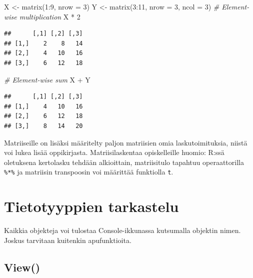 \documentclass[
]{book}
\newenvironment{Shaded}{\begin{snugshade}}{\end{snugshade}}
\newcommand{\AttributeTok}[1]{\textcolor[rgb]{0.77,0.63,0.00}{#1}}
\newcommand{\CommentTok}[1]{\textcolor[rgb]{0.56,0.35,0.01}{\textit{#1}}}
\newcommand{\DecValTok}[1]{\textcolor[rgb]{0.00,0.00,0.81}{#1}}
\newcommand{\FunctionTok}[1]{\textcolor[rgb]{0.00,0.00,0.00}{#1}}
\newcommand{\NormalTok}[1]{#1}
\newcommand{\OtherTok}[1]{\textcolor[rgb]{0.56,0.35,0.01}{#1}}
\newcommand{\SpecialCharTok}[1]{\textcolor[rgb]{0.00,0.00,0.00}{#1}}
\begin{document}
\begin{Shaded}
\begin{Highlighting}[]
\NormalTok{X }\OtherTok{\textless{}{-}} \FunctionTok{matrix}\NormalTok{(}\DecValTok{1}\SpecialCharTok{:}\DecValTok{9}\NormalTok{, }\AttributeTok{nrow =} \DecValTok{3}\NormalTok{)}
\NormalTok{Y }\OtherTok{\textless{}{-}} \FunctionTok{matrix}\NormalTok{(}\DecValTok{3}\SpecialCharTok{:}\DecValTok{11}\NormalTok{, }\AttributeTok{nrow =} \DecValTok{3}\NormalTok{, }\AttributeTok{ncol =} \DecValTok{3}\NormalTok{)}
\CommentTok{\# Element{-}wise multiplication}
\NormalTok{X }\SpecialCharTok{*} \DecValTok{2}
\end{Highlighting}
\end{Shaded}

\begin{verbatim}
##      [,1] [,2] [,3]
## [1,]    2    8   14
## [2,]    4   10   16
## [3,]    6   12   18
\end{verbatim}

\begin{Shaded}
\begin{Highlighting}[]
\CommentTok{\# Element{-}wise sum}
\NormalTok{X }\SpecialCharTok{+}\NormalTok{ Y}
\end{Highlighting}
\end{Shaded}

\begin{verbatim}
##      [,1] [,2] [,3]
## [1,]    4   10   16
## [2,]    6   12   18
## [3,]    8   14   20
\end{verbatim}

Matriiseille on lisäksi määritelty paljon matriisien omia laskutoimituksia, niistä voi lukea lisää oppikirjasta. Matriisilaskentaa opiskelleille huomio: R:ssä oletuksena kertolasku tehdään alkioittain, matriisitulo tapahtuu operaattorilla \texttt{\%*\%} ja matriisin transpoosin voi määrittää funktiolla \texttt{t}.

\hypertarget{data-type-view}{%
\section{Tietotyyppien tarkastelu}\label{data-type-view}}

Kaikkia objekteja voi tulostaa Console-ikkunassa kutsumalla objektin nimen. Joskus tarvitaan kuitenkin apufunktioita.

\hypertarget{view}{%
\subsection{View()}\label{view}}
\end{document}
